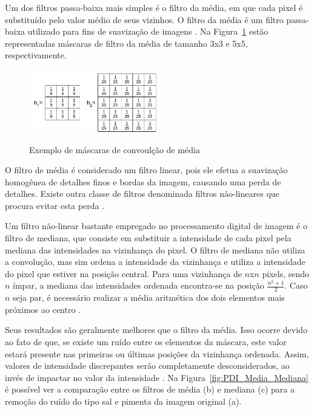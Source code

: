 \documentclass[12pt,oneside,a4paper,english,french,spanish,brazil,]{abntex2}
\begin{document}
Um dos filtros passa-baixa mais simples é o filtro da média, em que cada pixel é substituído pelo valor médio de seus vizinhos. O filtro da média é um filtro passa-baixa utilizado para fins de suavização de imagens \cite{pedrini:2008}. Na Figura~\ref{fig:PDI_Mascara_Media} estão representadas máscaras de filtro da média de tamanho 3x3 e 5x5, respectivamente.

\begin{figure}[ht]
\centering
\caption{Exemplo de máscaras de convoulção de média}
\includegraphics[width=0.5\textwidth]{imagens/PDI_Mascara_Media.pdf}
\label{fig:PDI_Mascara_Media}
\end{figure}

O filtro de média é considerado um filtro linear, pois ele efetua a suavização homogênea de detalhes finos e bordas da imagem, causando uma perda de detalhes. Existe outra classe de filtros denominada filtros não-lineares que procura evitar esta perda \cite{pedrini:2008}.

Um filtro não-linear bastante empregado no processamento digital de imagem é o filtro de mediana, que consiste em substituir a intensidade de cada pixel pela mediana das intensidades na vizinhança do pixel. O filtro de mediana não utiliza a convolução, mas sim ordena a intensidade da vizinhança e utiliza a intensidade do pixel que estiver na posição central. Para uma vizinhança de \(n\)x\(n\) pixels, sendo \(n\) ímpar, a mediana das intensidades ordenada encontra-se na posição \(\frac{n^2+1}{2}\). Caso \(n\) seja par, é necessário realizar a média aritmética dos dois elementos mais próximos ao centro \cite{gonzalez:2012}. 

Seus resultados são geralmente melhores que o filtro da média. Isso ocorre devido ao fato de que, se existe um ruído entre os elementos da máscara, este valor estará presente nas primeiras ou últimas posições da vizinhança ordenada. Assim, valores de intensidade discrepantes serão completamente desconsiderados, ao invés de impactar no valor da intensidade \cite{conci:2003}. Na Figura~\ref{fig:PDI_Media_Mediana} é possível ver a comparação entre os filtros de média (b) e mediana (c) para a remoção do ruído do tipo sal e pimenta da imagem original (a).
\end{document}
